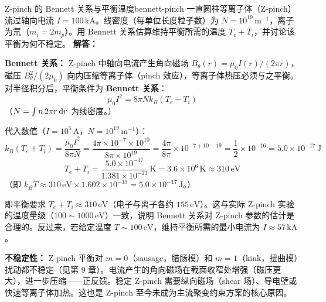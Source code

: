 \begin{example}{Z-pinch 的 Bennett 关系与平衡温度}{bennett-pinch}
一直圆柱等离子体（Z-pinch）流过轴向电流 $I = 100\,\mathrm{kA}$。线密度（每单位长度粒子数）为 $N = 10^{19}\,\mathrm{m^{-1}}$，离子为氘（$m_i = 2m_p$）。用 Bennett 关系估算维持平衡所需的温度 $T_e + T_i$，并讨论该平衡为何不稳定。
\tcblower
\textbf{解答：}

\textbf{Bennett 关系：} Z-pinch 中轴向电流产生角向磁场 $B_\theta(r) = \mu_0 I(r)/(2\pi r)$，磁压 $B_\theta^2/(2\mu_0)$ 向内压缩等离子体（pinch 效应），等离子体热压必须与之平衡。对半径积分后，平衡条件为 \textbf{Bennett 关系}：
\[
\mu_0 I^2 = 8\pi N k_{\!B}(T_e + T_i)
\]
（$N = \int n\,2\pi r\,\mathrm{d} r$ 为线密度。）

代入数值（$I = 10^5\,\mathrm{A}$，$N = 10^{19}\,\mathrm{m^{-1}}$）：
\[
k_{\!B}(T_e+T_i) = \frac{\mu_0 I^2}{8\pi N}
= \frac{4\pi\times10^{-7}\times10^{10}}{8\pi\times10^{19}}
= \frac{4\pi}{8\pi}\times10^{-7+10-19}
= \frac{1}{2}\times10^{-16}
= 5.0\times10^{-17}\,\mathrm{J}
\]
\[
T_e + T_i = \frac{5.0\times10^{-17}}{1.381\times10^{-23}}\,\mathrm{K} = 3.6\times10^{6}\,\mathrm{K} \approx 310\,\mathrm{eV}
\]
（即 $k_{\!B}T \approx 310\,\mathrm{eV}\times1.602\times10^{-19} = 5.0\times10^{-17}\,\mathrm{J}$。）

即平衡要求 $T_e + T_i \approx 310\,\mathrm{eV}$（电子与离子各约 $155\,\mathrm{eV}$）。这与实际 Z-pinch 实验的温度量级（$100\sim1000\,\mathrm{eV}$）一致，说明 Bennett 关系对 Z-pinch 参数的估计是合理的。反过来，若给定温度 $T\sim100\,\mathrm{eV}$，维持平衡所需的最小电流为 $I \approx 57\,\mathrm{kA}$。

\textbf{不稳定性：} Z-pinch 平衡对 $m=0$（sausage，腊肠模）和 $m=1$（kink，扭曲模）扰动都不稳定（见第 9 章）。电流产生的角向磁场在截面收窄处增强（磁压更大），进一步压缩——正反馈。稳定 Z-pinch 需要纵向磁场（shear 场）、导电壁或快速等离子体加热。这也是 Z-pinch 至今未成为主流聚变约束方案的核心原因。
\end{example}

